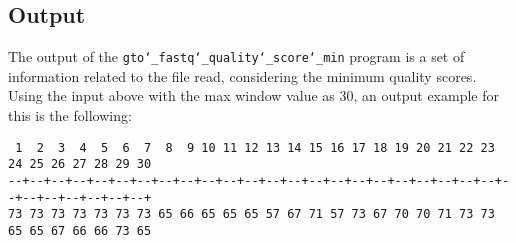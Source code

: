 \subsection*{Output}
The output of the \texttt{gto\char`_fastq\char`_quality\char`_score\char`_min} program is a set of information related to the file read, considering the minimum quality scores.  \\
Using the input above with the max window value as 30, an output example for this is the following:
\begin{lstlisting}
 1  2  3  4  5  6  7  8  9 10 11 12 13 14 15 16 17 18 19 20 21 22 23 24 25 26 27 28 29 30 
--+--+--+--+--+--+--+--+--+--+--+--+--+--+--+--+--+--+--+--+--+--+--+--+--+--+--+--+--+--+
73 73 73 73 73 73 73 65 66 65 65 65 57 67 71 57 73 67 70 70 71 73 73 65 65 67 66 66 73 65 
\end{lstlisting}